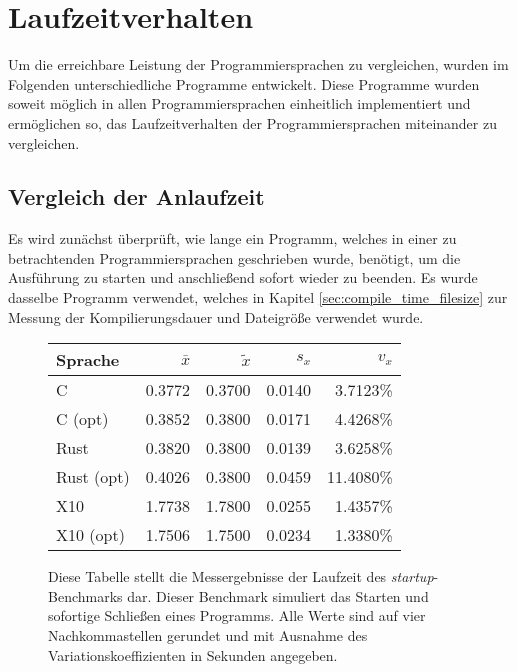 \section{Laufzeitverhalten}

Um die erreichbare Leistung der Programmiersprachen zu vergleichen,
wurden im Folgenden unterschiedliche Programme entwickelt.
Diese Programme wurden soweit möglich in allen Programmiersprachen einheitlich implementiert und ermöglichen so,
das Laufzeitverhalten der Programmiersprachen miteinander zu vergleichen.

\subsection{Vergleich der Anlaufzeit}

Es wird zunächst überprüft, wie lange ein Programm,
welches in einer zu betrachtenden Programmiersprachen geschrieben wurde,
benötigt, um die Ausführung zu starten und anschließend sofort wieder zu beenden.
Es wurde dasselbe Programm verwendet, welches in Kapitel \ref{sec:compile_time_filesize} zur Messung
der Kompilierungsdauer und Dateigröße verwendet wurde.

\begin{figure}[hb]
	\begin{center}
		\begin{tabular}{lrrrr}
			\toprule
			Sprache    & $\bar{x}$ & $\tilde{x}$ & $s_x$ & $v_x$ \\
			\midrule
			C          & 0.3772 & 0.3700 & 0.0140 &  3.7123\% \\
			C (opt)    & 0.3852 & 0.3800 & 0.0171 &  4.4268\% \\
			Rust       & 0.3820 & 0.3800 & 0.0139 &  3.6258\% \\
			Rust (opt) & 0.4026 & 0.3800 & 0.0459 & 11.4080\% \\
			X10        & 1.7738 & 1.7800 & 0.0255 &  1.4357\% \\
			X10 (opt)  & 1.7506 & 1.7500 & 0.0234 &  1.3380\% \\
			\bottomrule
		\end{tabular}
	\end{center}
	\caption{
		Diese Tabelle stellt die Messergebnisse der Laufzeit des \textit{startup}-Benchmarks dar.
		Dieser Benchmark simuliert das Starten und sofortige Schließen eines Programms.
		Alle Werte sind auf vier Nachkommastellen gerundet und mit Ausnahme des Variationskoeffizienten
		in Sekunden angegeben.
	}
	\label{fig:startup_table}
\end{figure}

